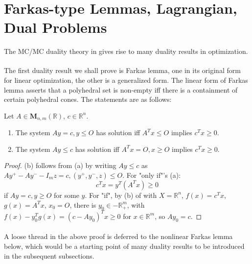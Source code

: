 \section{Farkas-type Lemmas, Lagrangian, Dual Problems}
\label{sect:041}

\paragraph{}The MC/MC duality theory in  gives rise to many duality results in optimization.

\paragraph{}The first duality result we shall prove is Farkas lemma, one in its original form for linear optimization, the other is a generalized form. The linear form of Farkas lemma asserts that a polyhedral set is non-empty iff there is a containment of certain polyhedral cones. The statements are as follows:

\begin{prop}\label{prop:041-farkas-lemma-linear}
	Let $A\in \mathbf{M}_{n,m}(\mathbb{R})$, $c\in \mathbb{R}^n$.
	\begin{enumerate}[label=(\alph*)]
		\item The system $Ay=c,y\leq O$ has solution iff $A^Tx\leq O$ implies $c^Tx\geq 0$.
		\item The system $Ay\leq c$ has solution iff $A^Tx=O,x\geq O$ implies $c^Tx\geq 0$.
	\end{enumerate}
\end{prop}

\begin{proof}
	(b) follows from (a) by writing $Ay\leq c$ as $Ay^+-Ay^--I_mz=c,(y^+,y^-,z)\leq O$. For "only if"'s (a):
	\[
		c^Tx=y^T(A^Tx)\geq 0
	\]
	if $Ay=c,y\geq O$ for some $y$. For "if", by (b) of  with $X=\mathbb{R}^n$, $f(x)=c^Tx$, $g(x)=A^Tx$, $x_0=O$, there is $y_0\in -\mathbb{R}_+^m$, with $f(x)-y_0^Tg(x)=(c-Ay_0)^Tx\geq 0$ for $x\in \mathbb{R}^m$, so $Ay_0=c$.
\end{proof}

\paragraph{}A loose thread in the above proof is deferred to the nonlinear Farkas lemma below, which would be a starting point of many duality results to be introduced in the subsequent subsections.

